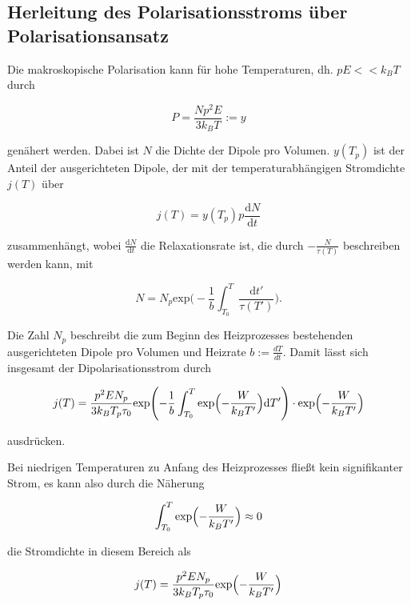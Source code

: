 \subsection{Herleitung des Polarisationsstroms über Polarisationsansatz}
\label{sec:pol}

Die makroskopische Polarisation kann für hohe Temperaturen, dh. $p E << k_B T $ durch 

\begin{equation}
    P = \frac{N p^2 E}{3 k_B T} := y
\end{equation}

genähert werden. Dabei ist $N$ die Dichte der Dipole pro Volumen. $y(T_p)$ ist der Anteil der ausgerichteten Dipole, der mit der temperaturabhängigen Stromdichte $j(T)$ über 

\begin{equation}
    j(T) = y(T_p) p \frac{\text{d}N}{\text{d}t}
\end{equation}

zusammenhängt, wobei $\frac{\text{d}N}{\text{d}t}$ die Relaxationsrate ist, die durch $- \frac{N}{\tau(T)}$ beschreiben werden kann, mit 

\begin{equation}
    N = N_p \text{exp} \Biggl( -\frac{1}{b} \int_{T_0}^{T} \frac{\text{d}t'}{\tau(T')} \Biggr).    
\end{equation}

Die Zahl $N_p$ beschreibt die zum Beginn des Heizprozesses bestehenden ausgerichteten Dipole pro Volumen und Heizrate $b := \frac{dT}{dt}$. 
Damit lässt sich insgesamt der Dipolarisationsstrom durch 

\begin{equation}
    j(T) = \frac{p^2 E N_p}{3 k_B T_p \tau_0} \text{exp} \Biggl(-\frac{1}{b} \int_{T_0}^{T} \text{exp} \Bigl( - \frac{W}{k_B T'} \Bigr) \text{d}T' \Biggr)\cdot 
    \text{exp} \Bigl( - \frac{W}{k_B T'} \Bigr)
\end{equation}

ausdrücken. 

Bei niedrigen Temperaturen zu Anfang des Heizprozesses fließt kein signifikanter Strom, es kann also durch die Näherung 

\begin{equation}
    \int_{T_0}^{T} \text{exp} \Bigl( - \frac{W}{k_B T'} \Bigr) \approx 0 
\end{equation}

die Stromdichte in diesem Bereich als 

\begin{equation}
    j(T) = \frac{p^2 E N_p}{3 k_B T_p \tau_0} \text{exp} \Bigl( - \frac{W}{k_B T'} \Bigr)
\end{equation}

